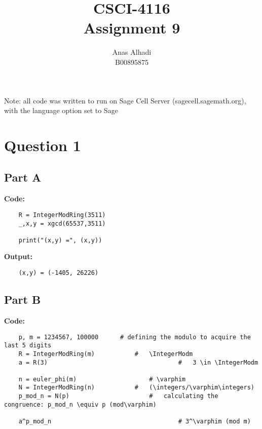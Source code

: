 \documentclass{article}
\title{\textbf{CSCI-4116\\Assignment 9}}
\author{Anas Alhadi\\B00895875}
\numberwithin{equation}{subsection}
\begin{document}
	\maketitle

	\vspace{20pt}
	\par{Note: all code was written to run on Sage Cell Server (sagecell.sagemath.org), with the language option set to Sage}

	\hrulefill

	\vspace{25pt}
	\section*{Question 1}
	\subsection*{Part A}

\vspace{10pt}
\textbf{Code:}

\begin{lstlisting}
	R = IntegerModRing(3511)
	_,x,y = xgcd(65537,3511)

	print("(x,y) =", (x,y))
\end{lstlisting}

\textbf{Output:}
\begin{lstlisting}
	(x,y) = (-1405, 26226)
\end{lstlisting}


\vspace{25pt}
\subsection*{Part B}

\vspace{10pt}
\textbf{Code:}
\begin{lstlisting}
	p, m = 1234567, 100000		# defining the modulo to acquire the last 5 digits
	R = IntegerModRing(m)			#	\IntegerModm	
	a = R(3)									#	3 \in \IntegerModm

	n = euler_phi(m)					# \varphim
	N = IntegerModRing(n)			#	(\integers/\varphim\integers)
	p_mod_n = N(p)						#	calculating the congruence: p_mod_n \equiv p (mod\varphim)

	a^p_mod_n									# 3^\varphim (mod m)
\end{lstlisting}

\newpage
	\thispagestyle{fancy}
\end{document}
